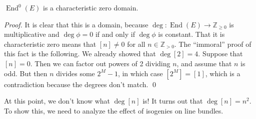 \begin{proposition}
  \( \operatorname{End}^0 \left( E \right) \) is a characteristic zero domain.
\end{proposition}
\textit{Proof.}
It is clear that this is a domain, because \( \operatorname{deg} \colon \operatorname{End}(E) \to \mathbb{Z}_{\geq 0} \) is multiplicative and \( \operatorname{deg} \phi = 0 \) if and only if \( \operatorname{deg} \phi \) is constant.
That it is characteristic zero means that \( [n] \neq 0 \) for all \( n \in \mathbb{Z}_{>0} \).
The ``immoral'' proof of this fact is the following. We already showed that \( \operatorname{deg} [2] = 4 \).
Suppose that \( [n] = 0 \). Then we can factor out powers of 2 dividing \( n \), and assume that \( n \) is odd.
But then \( n \) divides some \( 2^M - 1 \), in which case \( [2^M] = [1] \), which is a contradiction because the degrees don't match. \qed

At this point, we don't know what \( \operatorname{deg} [n] \) is!
It turns out that \( \operatorname{deg}[n] = n^2 \).
To show this, we need to analyze the effect of isogenies on line bundles.


